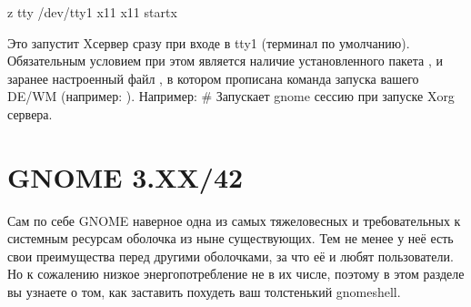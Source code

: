 \documentclass[letterpaper,10pt,russian,openany]{sphinxmanual}
\begin{document}
\begin{sphinxVerbatim}[commandchars=\\\{\}]
 \PYG{o}{[}\PYG{o}{[} \PYGZhy{}z   tty  /dev/tty1 \PYG{o}{]}\PYG{o}{]} 
  x11 x11  startx
\end{sphinxVerbatim}

\sphinxAtStartPar
Это запустит X\sphinxhyphen{}сервер сразу при входе в tty1 (терминал по умолчанию).
Обязательным условием при этом является наличие установленного пакета ,
и заранее настроенный файл , в котором прописана команда запуска вашего DE/WM (например: ).
Например:  \# Запускает gnome сессию при запуске Xorg сервера.

\ignorespaces 

\section{GNOME 3.XX/42}
\label{\detokenize{source/de-optimizations:gnome-3-xx-42}}\label{\detokenize{source/de-optimizations:gnome-optimization}}\label{\detokenize{source/de-optimizations:index-1}}
\sphinxAtStartPar
Сам по себе GNOME \sphinxhyphen{} наверное одна из самых тяжеловесных и требовательных к системным ресурсам оболочка из ныне существующих.
Тем не менее у неё есть свои преимущества перед другими оболочками, за что её и любят пользователи.
Но к сожалению низкое энергопотребление не в их числе, поэтому в этом разделе вы узнаете о том,
как заставить похудеть ваш толстенький gnome\sphinxhyphen{}shell.

\ignorespaces 
\end{document}
